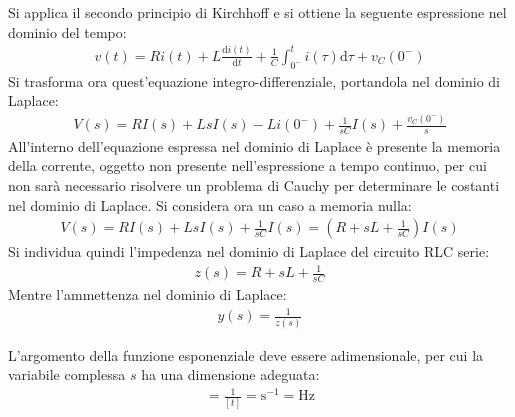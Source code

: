 \documentclass{article}
\newcommand{\df}{\mathrm{d}}
\newcommand{\SI}[1]{\mathrm{#1}}
\numberwithin{equation}{subsection}
\begin{document}
Si applica il secondo principio di Kirchhoff e si ottiene la seguente espressione nel dominio del tempo:
\begin{gather*}
    v(t)=Ri(t)+L\displaystyle\frac{\df i(t)}{\df t}+\frac{1}{C}\int_{0^-}^ti(\tau)\df\tau+v_C(0^-)
\end{gather*}
Si trasforma ora quest'equazione integro-differenziale, portandola nel dominio di Laplace:
\begin{gather*}
    V(s)=RI(s)+LsI(s)-Li(0^-)+\displaystyle\frac{1}{sC}I(s)+\frac{v_C(0^-)}{s}
\end{gather*}
All'interno dell'equazione espressa nel dominio di Laplace è presente la memoria della corrente, oggetto non presente nell'espressione a tempo continuo, per cui non sarà 
necessario risolvere un problema di Cauchy per determinare le costanti nel dominio di Laplace. Si considera ora un caso a memoria nulla:
\begin{gather*}
    V(s)=RI(s)+LsI(s)+\displaystyle\frac{1}{sC}I(s)=\left(R+sL+\frac{1}{sC}\right)I(s)
\end{gather*}
Si individua quindi l'impedenza nel dominio di Laplace del circuito RLC serie:
\begin{gather*}
    z(s)=R+sL+\displaystyle\frac{1}{sC}
\end{gather*}
Mentre l'ammettenza nel dominio di Laplace:
\begin{gather*}
    y(s)=\displaystyle\frac{1}{z(s)}
\end{gather*} 

L'argomento della funzione esponenziale deve essere adimensionale, per cui la variabile complessa $s$ ha una dimensione adeguata:
\begin{gather*}
    [s]=\displaystyle\frac{1}{[t]}=\SI{s}^{-1}=\SI{Hz}
\end{gather*}
\end{document}
